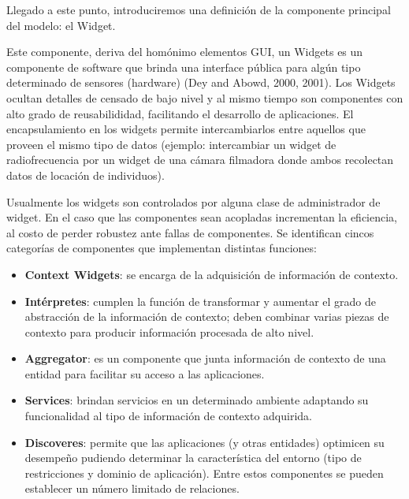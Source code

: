 Llegado a este punto, introduciremos una definición de la componente
principal
del modelo: el Widget.


Este componente, deriva del homónimo elementos GUI, un Widgets es un componente
de software que brinda una interface pública para algún tipo determinado de
sensores
(hardware) (Dey and Abowd, 2000, 2001). Los Widgets ocultan detalles de censado
de
bajo nivel y al mismo tiempo son componentes con alto grado de reusabilididad,
facilitando el desarrollo de aplicaciones. El encapsulamiento en los widgets
permite
intercambiarlos entre aquellos que proveen el mismo tipo de datos (ejemplo:
intercambiar un widget de radiofrecuencia por un widget de una cámara filmadora
donde ambos recolectan datos de locación de individuos).


Usualmente los widgets son controlados por alguna clase de administrador de
widget.
En el caso que las componentes sean acopladas incrementan la eficiencia, al
costo de
perder robustez ante fallas de componentes.
Se identifican cincos categorías de componentes que implementan distintas
funciones:

\begin{itemize}

\item 
\textbf{Context Widgets}: se encarga de la adquisición de información de
contexto.

\item
\textbf{Intérpretes}: cumplen la función de transformar y aumentar el grado de
abstracción de la información de contexto; deben combinar varias piezas de
contexto para producir información procesada de alto nivel.

\item
\textbf{Aggregator}: es un componente que junta información de contexto de una
entidad para facilitar su acceso a las aplicaciones.

\item
\textbf{Services}: brindan servicios en un determinado ambiente adaptando su
funcionalidad al tipo de información de contexto adquirida.

\item
\textbf{Discoveres}: permite que las aplicaciones (y otras entidades) optimicen
su desempeño pudiendo determinar la característica del entorno (tipo de
restricciones y dominio de aplicación). Entre estos componentes se pueden
establecer un número limitado de relaciones.

\end{itemize} 

